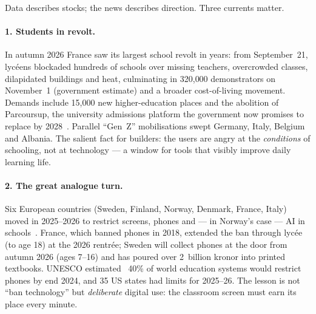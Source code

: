 \documentclass[11pt,a4paper]{article}
\begin{document}
Data describes stocks; the news describes direction. Three currents matter.

\paragraph{1. Students in revolt.} In autumn 2026 France saw its largest
school revolt in years: from September~21, lyc\'eens blockaded hundreds of
schools over missing teachers, overcrowded classes, dilapidated buildings and
heat, culminating in 320{,}000 demonstrators on November~1 (government
estimate) and a broader cost-of-living movement. Demands include 15{,}000 new
higher-education places and the abolition of Parcoursup, the university
admissions platform the government now promises to replace by
2028~\cite{ap-france-2026}. Parallel ``Gen~Z'' mobilisations swept Germany,
Italy, Belgium and Albania. The salient fact for builders: the users are angry
at the \emph{conditions} of schooling, not at technology --- a window for tools
that visibly improve daily learning life.

\paragraph{2. The great analogue turn.} Six European countries (Sweden, Finland,
Norway, Denmark, France, Italy) moved in 2025--2026 to restrict screens,
phones and --- in Norway's case --- AI in schools~\cite{wef-edtech-2026}.
France, which banned phones in 2018, extended the ban through lyc\'ee (to age
18) at the 2026 rentr\'ee; Sweden will collect phones at the door from autumn
2026 (ages 7--16) and has poured over 2~billion kronor into printed textbooks.
UNESCO estimated ~40\% of world education systems would restrict phones by end
2024, and 35 US states had limits for 2025--26. The lesson is not ``ban
technology'' but \emph{deliberate} digital use: the classroom screen must earn
its place every minute.
\end{document}
